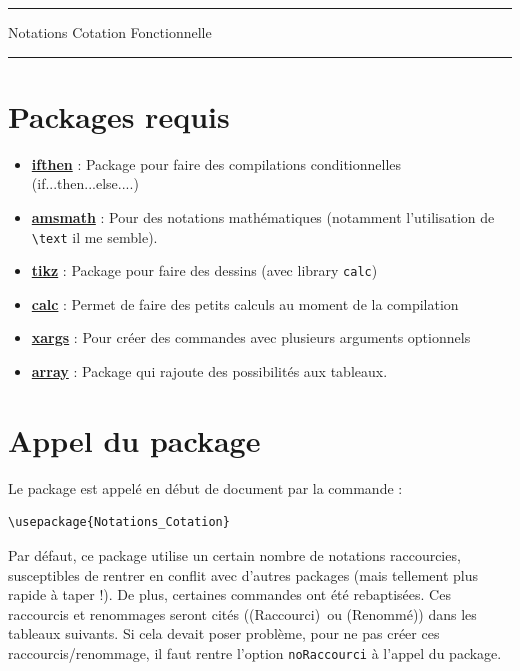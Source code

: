\documentclass[a4paper,12pt]{article}
\newcommand{\rac}{({\color{red}Raccourci})}
\newcommand{\ren}{({\color{blue}Renommé})}
\begin{document}
	\begin{center}
		\hrule{\Large Notations Cotation Fonctionnelle}\\\hrule
	\end{center}


	\section{Packages requis}

		\begin{itemize}
			\item \href{http://www.ctan.org/pkg/ifthen}{\textbf{ifthen}} : Package pour faire des compilations conditionnelles (if...then...else....)
			\item \href{http://www.ctan.org/pkg/amsmath}{\textbf{amsmath}} : Pour des notations mathématiques (notamment l'utilisation de \verb!\text! il me semble).
			\item \href{http://www.ctan.org/pkg/pgf}{\textbf{tikz}} : Package pour faire des dessins (avec library \verb!calc!)
			\item \href{http://www.ctan.org/pkg/calc}{\textbf{calc}} : Permet de faire des petits calculs au moment de la compilation
			\item \href{http://www.ctan.org/pkg/xargs}{\textbf{xargs}} : Pour créer des commandes avec plusieurs arguments optionnels
			\item \href{http://www.ctan.org/pkg/array}{\textbf{array}} : Package qui rajoute des possibilités aux tableaux.
		\end{itemize}
		
		
	\section{Appel du package}

		Le package est appelé en début de document par la commande :
		\begin{verbatim}
\usepackage{Notations_Cotation}
		\end{verbatim}

		Par défaut, ce package utilise un certain nombre de notations raccourcies, susceptibles de rentrer en conflit avec d'autres packages (mais tellement plus rapide à taper !).
		De plus, certaines commandes ont été rebaptisées.
		Ces raccourcis et renommages seront cités (\rac\ ou \ren) dans les tableaux suivants.
		Si cela devait poser problème, pour ne pas créer ces raccourcis/renommage, il faut rentre l'option \verb!noRaccourci! à l'appel du package.
\end{document}
